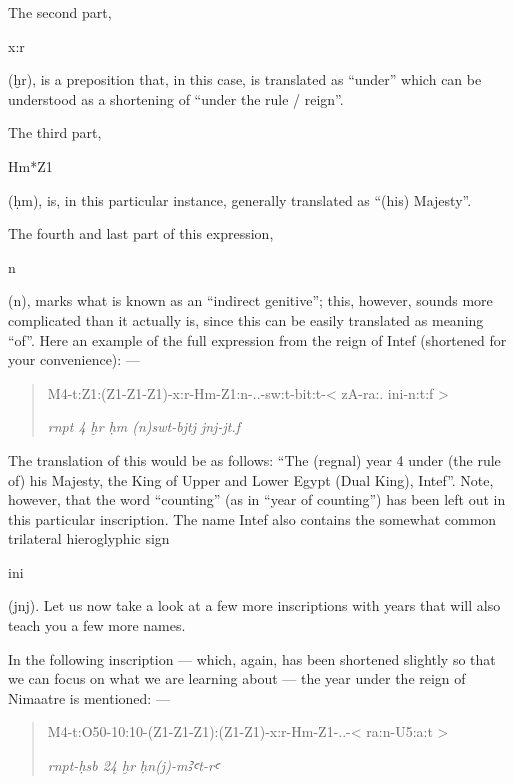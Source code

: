 \documentclass[a5paper,twoside,11pt]{report}
\newcommand{\AHiero}{{\fontspec{DejaVu Sans}Ꜣ}}
\newcommand{\aHiero}{{\fontspec{DejaVu Sans}ꜥ}}
\newcommand{\xHiero}{ḫ}
\newcommand{\HHiero}{ḥ}
\begin{document}
			The second part, \begin{hieroglyph}x:r\end{hieroglyph} (ḫr), is a preposition that, in this case, is translated as “under” which can be understood as a shortening of “under the rule / reign”.

			The third part, \begin{hieroglyph}Hm*Z1\end{hieroglyph} (ḥm), is, in this particular instance, generally translated as “(his) Majesty”.

			The fourth and last part of this expression, \begin{hieroglyph}n\end{hieroglyph} (n), marks what is known as an “indirect genitive”; this, however, sounds more complicated than it actually is, since this can be easily translated as meaning “of”.
			Here an example of the full expression from the reign of Intef (shortened for your convenience): —

			\begin{quote}
				\begin{hieroglyph}
					M4-t:Z1:(Z1-Z1-Z1)-x:r-Hm-Z1:n-..-sw:t-bit:t-< zA-\!\!ra:. ini-n:t:f >
				\end{hieroglyph}
				\newline
				\textit{rnpt 4 \xHiero r \HHiero m (n)swt-bjtj jnj-jt.f}
        \newline
        \parencite[p. 116]{scotthiero}
			\end{quote}

			The translation of this would be as follows: “The (regnal) year 4 under (the rule of) his Majesty, the King of Upper and Lower Egypt (Dual King), Intef”. Note, however, that the word “counting” (as in “year of counting”) has been left out in this particular inscription. The name Intef also contains the somewhat common trilateral hieroglyphic sign \begin{hieroglyph}ini\end{hieroglyph} (jnj).
      Let us now take a look at a few more inscriptions with years that will also teach you a few more names.

      In the following inscription — which, again, has been shortened slightly so that we can focus on what we are learning  about — the  year under the reign of Nimaatre is mentioned: —
      
      \begin{quote}
        \begin{hieroglyph}
          M4-t:O50-10:10-(Z1-Z1-Z1):(Z1-Z1)-x:r-Hm-Z1-..-< ra:n-U5:a:t >
        \end{hieroglyph}
        \newline
        \textit{rnpt-\HHiero sb 24 \xHiero r \HHiero n(j)-m\AHiero \aHiero t-r\aHiero}
        \parencite[p. 22]{scotthiero}
      \end{quote}
\end{document}
